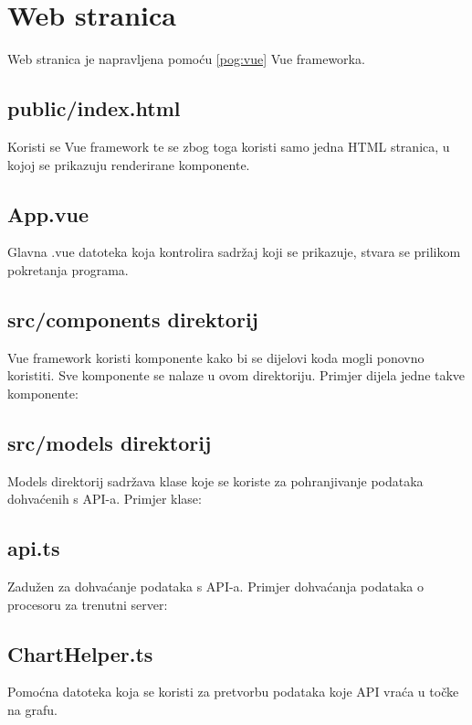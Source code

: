 \documentclass[zavrsnirad]{fer}
\begin{document}
\chapter{Web stranica}
Web stranica je napravljena pomoću \ref{pog:vue} Vue frameworka.

\section{public/index.html}
Koristi se Vue framework te se zbog toga koristi samo jedna HTML stranica, u kojoj se prikazuju renderirane komponente.

\section{App.vue}
Glavna .vue datoteka koja kontrolira sadržaj koji se prikazuje, stvara se prilikom pokretanja programa.

\section{src/components direktorij}
Vue framework koristi komponente kako bi se dijelovi koda mogli ponovno koristiti. Sve komponente se nalaze u ovom direktoriju. Primjer dijela jedne takve komponente:


\section{src/models direktorij}
Models direktorij sadržava klase koje se koriste za pohranjivanje podataka dohvaćenih s API-a. Primjer klase:


\section{api.ts}
Zadužen za dohvaćanje podataka s API-a. Primjer dohvaćanja podataka o procesoru za trenutni server:


\section{ChartHelper.ts}
Pomoćna datoteka koja se koristi za pretvorbu podataka koje API vraća u točke na grafu.
\end{document}
